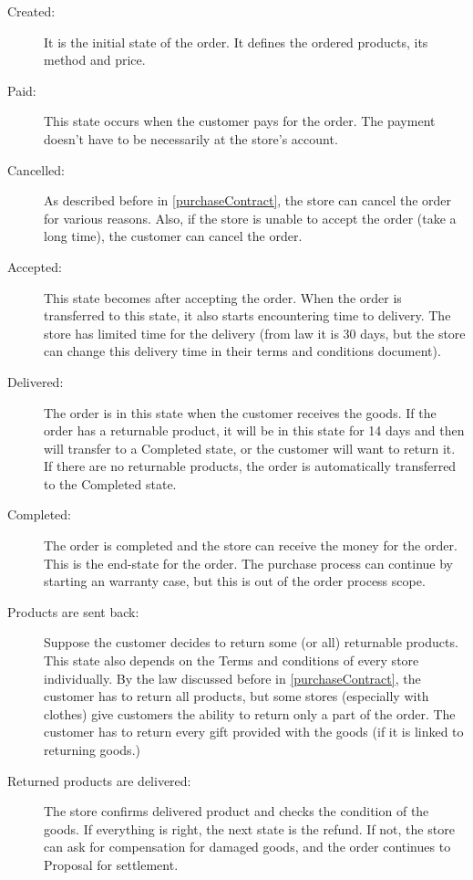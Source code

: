\documentclass[thesis=M,english]{FITthesis}[2019/12/23]
\begin{document}
\begin{description}

\item[Created:]
It is the initial state of the order. It defines the ordered products, its method and price.

\item[Paid:]
This state occurs when the customer pays for the order. The payment doesn't have to be necessarily at the store's account.

\item[Cancelled:]
As described before in \ref{purchaseContract}, the store can cancel the order for various reasons. 
Also, if the store is unable to accept the order (take a long time), the customer can cancel the order.

\item[Accepted:]
This state becomes after accepting the order. When the order is transferred to this state, it also starts encountering time to delivery. The store has limited time for the delivery (from law \cite{customerProtection} it is 30 days, but the store can change this delivery time in their terms and conditions document). 

\item[Delivered:]
The order is in this state when the customer receives the goods.
If the order has a returnable product, it will be in this state for 14 days and then will transfer to a Completed state, or the customer will want to return it.
If there are no returnable products, the order is automatically transferred to the Completed state.

\item[Completed:]
The order is completed and the store can receive the money for the order. This is the end-state for the order. The purchase process can continue by starting an warranty case, but this is out of the order process scope. 

\item[Products are sent back:]
Suppose the customer decides to return some (or all) returnable products. This state also depends on the Terms and conditions of every store individually. 
By the law discussed before in \ref{purchaseContract}, the customer has to return all products, but some stores (especially with clothes) give customers the ability to return only a part of the order. The customer has to return every gift provided with the goods (if it is linked to returning goods.)

\item[Returned products are delivered:]
The store confirms delivered product and checks the condition of the goods. If everything is right, the next state is the refund.  If not, the store can ask for compensation for damaged goods, and the order continues to Proposal for settlement.


\end{description}
\end{document}
